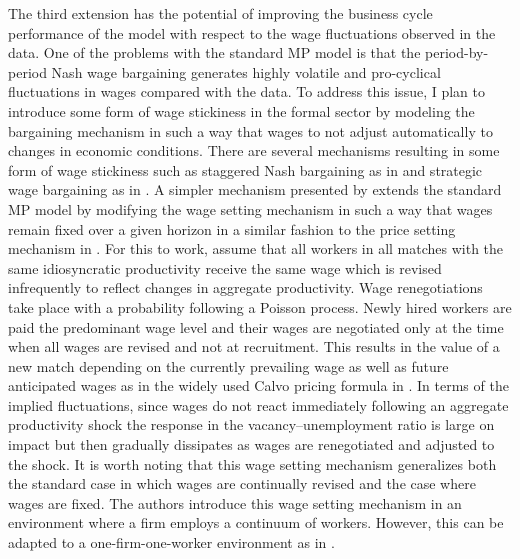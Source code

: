 \documentclass[12pt,a4paper,titlepage]{article}
\begin{document}
The third extension has the potential of improving the business cycle performance of the model with respect to the wage fluctuations observed in the data. One of the problems with the standard MP model \citep{Mortensen1994} is that the period-by-period Nash wage bargaining generates highly volatile and pro-cyclical fluctuations in wages compared with the data. To address this issue, I plan to introduce some form of wage stickiness in the formal sector by modeling the bargaining mechanism in such a way that wages to not adjust automatically to changes in economic conditions. There are several mechanisms resulting in some form of wage stickiness such as staggered Nash bargaining as in \cite{Gertler2009} and strategic wage bargaining as in \cite{Hall2008}. A simpler mechanism presented by \cite{Gertler2009} extends the standard MP model by modifying the wage setting mechanism in such a way that wages remain fixed over a given horizon in a similar fashion to the price setting mechanism in \cite{Calvo1983}. For this to work, \cite{Gertler2009} assume that all workers in all matches with the same idiosyncratic productivity receive the same wage which is revised infrequently to reflect changes in aggregate productivity. Wage renegotiations take place with a probability following a Poisson process. Newly hired workers are paid the predominant wage level and their wages are negotiated only at the time when all wages are revised and not at recruitment. This results in the value of a new match depending on the currently prevailing wage as well as future anticipated wages as in the widely used Calvo pricing formula in \cite{Calvo1983}. In terms of the implied fluctuations, since wages do not react immediately following an aggregate productivity shock the response in the vacancy–unemployment ratio is large on impact but then gradually dissipates as wages are renegotiated and adjusted to the shock. It is worth noting that this wage setting mechanism generalizes both the standard case in which wages are continually revised and the case where wages are fixed. The authors introduce this wage setting mechanism in an environment where a firm employs a continuum of workers. However, this can be adapted to a one-firm-one-worker environment as in \cite{Mortensen2007}.
\end{document}
